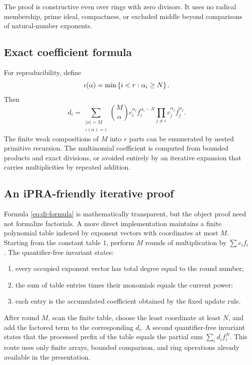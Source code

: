 The proof is constructive even over rings with zero divisors.  It uses no radical membership,
prime ideal, compactness, or excluded middle beyond comparisons of natural-number exponents.

\subsection{Exact coefficient formula}

For reproducibility, define
\[
  \iota(\alpha)=\min\left\{i<r:\alpha_i\geq N\right\}.
\]
Then
\begin{equation}\label{eq:di-formula}
 d_i=\sum_{\substack{|\alpha|=M\\ \iota(\alpha)=i}}
 \binom{M}{\alpha}
 c_i^{\alpha_i}f_i^{\alpha_i-N}
 \prod_{j\neq i}c_j^{\alpha_j}f_j^{\alpha_j}.
\end{equation}
The finite weak compositions of $M$ into $r$ parts can be enumerated by nested primitive recursion.
The multinomial coefficient is computed from bounded products and exact divisions, or avoided
entirely by an iterative expansion that carries multiplicities by repeated addition.

\subsection{An iPRA-friendly iterative proof}

Formula \eqref{eq:di-formula} is mathematically transparent, but the object proof need not formalize
factorials.  A more direct implementation maintains a finite polynomial table indexed by exponent
vectors with coordinates at most $M$.  Starting from the constant table $1$, perform $M$ rounds of
multiplication by $\sum c_i f_i$.  The quantifier-free invariant states:

\begin{enumerate}[label=(\roman*)]
\item every occupied exponent vector has total degree equal to the round number;
\item the sum of table entries times their monomials equals the current power;
\item each entry is the accumulated coefficient obtained by the fixed update rule.
\end{enumerate}

After round $M$, scan the finite table, choose the least coordinate at least $N$, and add the factored
term to the corresponding $d_i$.  A second quantifier-free invariant states that the processed prefix
of the table equals the partial sum $\sum_i d_i f_i^N$.  This route uses only finite arrays, bounded
comparison, and ring operations already available in the presentation.

